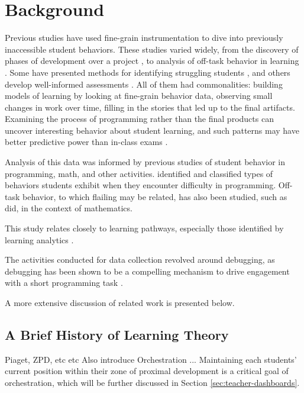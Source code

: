 \chapter{Background}
\label{chap:background}

Previous studies have used fine-grain instrumentation to dive into previously inaccessible student behaviors. These studies varied widely, from the discovery of phases of development over a project \citep{berland-2013, martin2013nanogenetic}, to analysis of off-task behavior in learning \citep{baker2004off}. Some have presented methods for identifying struggling students \cite{piech-2012}, and others develop well-informed assessments \citep{werner2012fairy}. All of them had commonalities: building models of learning by looking at fine-grain behavior data, observing small changes in work over time, filling in the stories that led up to the final artifacts. Examining the process of programming rather than the final products can uncover interesting behavior about student learning, and such patterns may have better predictive power than in-class exams \citep{blikstein2014}.

Analysis of this data was informed by previous studies of student behavior in programming, math, and other activities. \cite{perkins-1986} identified and classified types of behaviors students exhibit when they encounter difficulty in programming. Off-task behavior, to which flailing may be related, has also been studied, such as \cite{baker2004off} did, in the context of mathematics. 

This study relates closely to learning pathways, especially those identified by learning analytics \citep{martin2013nanogenetic}. 

The activities conducted for data collection revolved around debugging, as debugging has been shown to be a compelling mechanism to drive engagement with a short programming task \citep{webb2010troubleshooting}.

A more extensive discussion of related work is presented below.


\section{A Brief History of Learning Theory}
\label{sec:learning-theory}
Piaget, ZPD, etc etc
Also introduce Orchestration
...
Maintaining each students' current position within their zone of proximal development is a critical goal of orchestration, which will be further discussed in Section \ref{sec:teacher-dashboards}.


